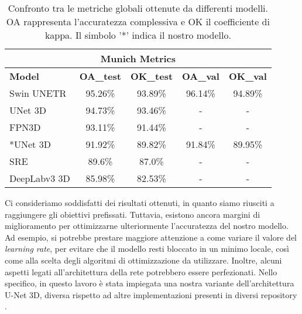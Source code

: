\begin{table}[H]
    \centering
    \setlength{\tabcolsep}{8pt} %
    \renewcommand{\arraystretch}{1.2} %
    \begin{tabular}{|l||c|c|c|c|}
    \hline
    \multicolumn{5}{|c|}{\textbf{Munich Metrics}} \\
    \hline
    \textbf{Model} & \textbf{OA\_test} & \textbf{OK\_test} & \textbf{OA\_val} & \textbf{OK\_val} \\
    \hline
    Swin UNETR \cite{ARTICOLO_TRANSFORMER} & 95.26\% & 93.89\% & 96.14\% &  94.89\% \\
    UNet 3D \cite{UNET_3D_munich_application} & 94.73\% &  93.46\% & - & - \\
    FPN3D \cite{FPN3D}  & 93.11\% &  91.44\% & - & - \\
    *UNet 3D & 91.92\% & 89.82\% & 91.84\% & 89.95\% \\
    SRE \cite{ARTICOLO_ORIGINALE_MUNICH} & 89.6\% & 87.0\% & - & - \\
    DeepLabv3 3D \cite{ARTICOLO_TRANSFORMER} & 85.98\% &  82.53\% & - & - \\

    \hline
    \end{tabular}
    \caption{Confronto tra le metriche globali ottenute da differenti modelli. 
    OA rappresenta l'accuratezza complessiva e OK il coefficiente di kappa.   
    Il simbolo '*' indica il nostro modello.}
    \label{tab:munich_metrics}
\end{table}


Ci consideriamo soddisfatti dei risultati ottenuti, in quanto siamo riusciti a 
raggiungere gli obiettivi prefissati. Tuttavia, esistono ancora margini di miglioramento 
per ottimizzarne ulteriormente l'accuratezza del nostro modello. Ad esempio, 
si potrebbe prestare maggiore attenzione a come variare il valore del \textit{learning rate}, per 
evitare che il modello resti bloccato in un minimo locale, così come alla scelta 
degli algoritmi di ottimizzazione da utilizzare.
Inoltre, alcuni aspetti legati all’architettura della rete potrebbero essere perfezionati. 
Nello specifico, in questo lavoro è stata impiegata una nostra variante dell’architettura 
U-Net 3D, diversa rispetto ad altre implementazioni presenti in diversi repository 
\cite{Implementazione1_3D_UNET,Implementazione2_3D_UNET,UNET_3D_munich_application}.







